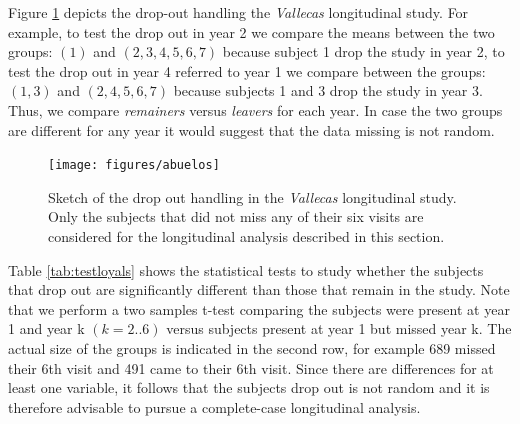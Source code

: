 \documentclass[11pt]{article}
\theoremstyle{definition}
\theoremstyle{remark}
\begin{document}
Figure \ref{fig:abuelos} depicts the drop-out handling the \emph{Vallecas} longitudinal study. For example, to test the drop out in year 2 we compare the means between the two groups: $(1)$ and $(2,3,4,5,6,7)$ because subject 1 drop the study in year 2, to test the drop out in year 4 referred to year 1 we compare between the groups: $(1,3)$ and $(2,4,5,6,7)$ because subjects 1 and 3 drop the study in year 3. Thus, we compare  \emph{remainers} versus \emph{leavers} for each year. In case the two groups are different for any year it would suggest that the data missing is not random. 

\begin{figure}[!htb]
        \centering
        \texttt{[image: figures/abuelos]}
        \caption{Sketch of the drop out handling in the \emph{Vallecas} longitudinal study. Only the subjects that did not miss any of their six visits are considered for the longitudinal analysis described in this section.} 
        \label{fig:abuelos}
\end{figure}

Table \ref{tab:testloyals} shows the statistical tests to study whether the subjects that drop out are significantly different than those that remain in the study. %
Note that we perform a two samples t-test comparing the subjects were present at year 1 and year k $(k=2..6)$ versus subjects present at year 1 but missed year k. The actual size of the groups is indicated in the second row, for example 689 missed their 6th visit and 491 came to their 6th visit. Since there are differences for at least one variable, it follows that the subjects drop out is not random and it is therefore advisable to pursue a complete-case longitudinal analysis.
\end{document}
